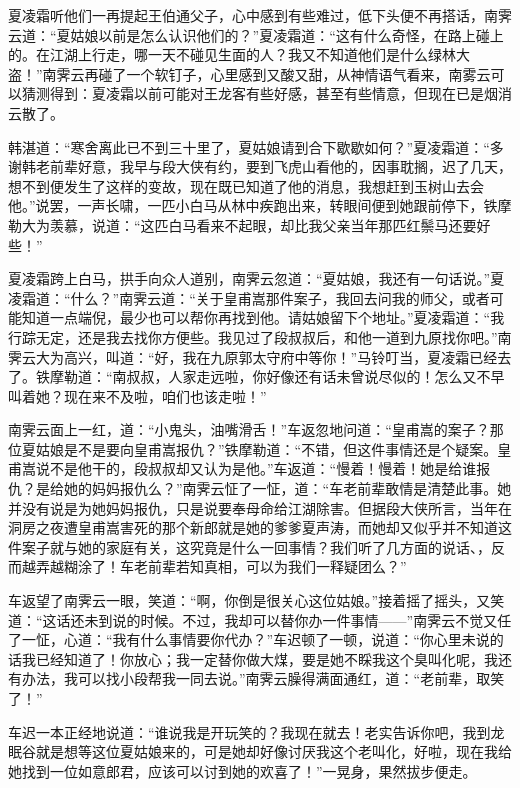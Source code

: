 \documentclass[12pt,oneside]{book}
\begin{document}
夏凌霜听他们一再提起王伯通父子，心中感到有些难过，低下头便不再搭话，南霁云道：``夏姑娘以前是怎么认识他们的？''夏凌霜道：``这有什么奇怪，在路上碰上的。在江湖上行走，哪一天不碰见生面的人？我又不知道他们是什么绿林大盗！''南霁云再碰了一个软钉子，心里感到又酸又甜，从神情语气看来，南雾云可以猜测得到：夏凌霜以前可能对王龙客有些好感，甚至有些情意，但现在已是烟消云散了。

韩湛道：``寒舍离此已不到三十里了，夏姑娘请到合下歇歇如何？''夏凌霜道：``多谢韩老前辈好意，我早与段大侠有约，要到飞虎山看他的，因事耽搁，迟了几天，想不到便发生了这样的变故，现在既已知道了他的消息，我想赶到玉树山去会他。''说罢，一声长啸，一匹小白马从林中疾跑出来，转眼间便到她跟前停下，铁摩勒大为羡慕，说道：``这匹白马看来不起眼，却比我父亲当年那匹红鬃马还要好些！''

夏凌霜跨上白马，拱手向众人道别，南霁云忽道：``夏姑娘，我还有一句话说。''夏凌霜道：``什么？''南霁云道：``关于皇甫嵩那件案子，我回去问我的师父，或者可能知道一点端倪，最少也可以帮你再找到他。请姑娘留下个地址。''夏凌霜道：``我行踪无定，还是我去找你方便些。我见过了段叔叔后，和他一道到九原找你吧。''南霁云大为高兴，叫道：``好，我在九原郭太守府中等你！''马铃叮当，夏凌霜已经去了。铁摩勒道：``南叔叔，人家走远啦，你好像还有话未曾说尽似的！怎么又不早叫着她？现在来不及啦，咱们也该走啦！''

南霁云面上一红，道：``小鬼头，油嘴滑舌！''车返忽地问道：``皇甫嵩的案子？那位夏姑娘是不是要向皇甫嵩报仇？''铁摩勒道：``不错，但这件事情还是个疑案。皇甫嵩说不是他干的，段叔叔却又认为是他。''车返道：``慢着！慢着！她是给谁报仇？是给她的妈妈报仇么？''南霁云怔了一怔，道：``车老前辈敢情是清楚此事。她并没有说是为她妈妈报仇，只是说要奉母命给江湖除害。但据段大侠所言，当年在洞房之夜遭皇甫嵩害死的那个新郎就是她的爹爹夏声涛，而她却又似乎并不知道这件案子就与她的家庭有关，这究竟是什么一回事情？我们听了几方面的说话、，反而越弄越糊涂了！车老前辈若知真相，可以为我们一释疑团么？''

车返望了南霁云一眼，笑道：``啊，你倒是很关心这位姑娘。''接着摇了摇头，又笑道：``这话还未到说的时候。不过，我却可以替你办一件事情------''南霁云不觉又任了一怔，心道：``我有什么事情要你代办？''车迟顿了一顿，说道：``你心里未说的话我已经知道了！你放心；我一定替你做大煤，要是她不睬我这个臭叫化呢，我还有办法，我可以找小段帮我一同去说。''南霁云臊得满面通红，道：``老前辈，取笑了！''

车迟一本正经地说道：``谁说我是开玩笑的？我现在就去！老实告诉你吧，我到龙眠谷就是想等这位夏姑娘来的，可是她却好像讨厌我这个老叫化，好啦，现在我给她找到一位如意郎君，应该可以讨到她的欢喜了！''一晃身，果然拔步便走。
\end{document}
